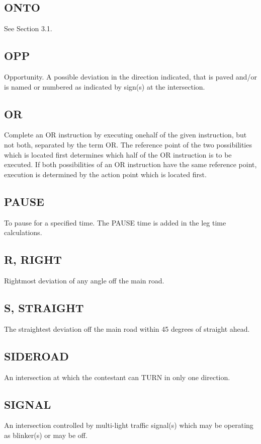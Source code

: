 \subsection{ONTO}
See Section 3.1.

\subsection{OPP} 
Opportunity. A possible deviation in the direction indicated, that is paved and/or is named or numbered as indicated by sign(s) at the intersection.

\subsection{OR}
Complete an OR instruction by executing onehalf of the given instruction, but not both, separated by the term OR. The reference point of the two possibilities which is located first determines which half of the OR instruction is to be executed. If both possibilities of an OR instruction have the same reference point, execution is determined by the action point which is located first.

\subsection{PAUSE}
To pause for a specified time. The PAUSE time is added in the leg time calculations.

\subsection{R, RIGHT}
Rightmost deviation of any angle off the main road.

\subsection{S, STRAIGHT}
The straightest deviation off the main road within 45 degrees of straight ahead.

\subsection{SIDEROAD}
An intersection at which the contestant can TURN in only one direction.

\subsection{SIGNAL}
An intersection controlled by multi-light traffic signal(s) which may be operating as blinker(s) or may be off.


